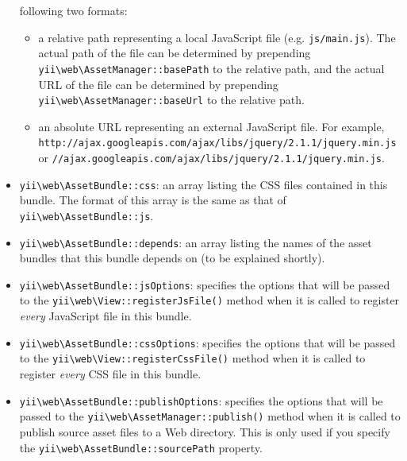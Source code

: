 \begin{itemize}
following two formats:\begin{itemize}
\item a relative path representing a local JavaScript file (e.g. \lstinline|js/main.js|). The actual path of the file
can be determined by prepending \texttt{yii{\allowbreak{}\textbackslash}web{\allowbreak{}\textbackslash}AssetManager\allowbreak{}::\allowbreak{}basePath} to the relative path, and the actual URL
of the file can be determined by prepending \texttt{yii{\allowbreak{}\textbackslash}web{\allowbreak{}\textbackslash}AssetManager\allowbreak{}::\allowbreak{}baseUrl} to the relative path.
\item an absolute URL representing an external JavaScript file. For example,
\lstinline|http://ajax.googleapis.com/ajax/libs/jquery/2.1.1/jquery.min.js| or
\lstinline|//ajax.googleapis.com/ajax/libs/jquery/2.1.1/jquery.min.js|.
\end{itemize}

\item \texttt{yii{\allowbreak{}\textbackslash}web{\allowbreak{}\textbackslash}AssetBundle\allowbreak{}::\allowbreak{}css}: an array listing the CSS files contained in this bundle. The format of this array
is the same as that of \texttt{yii{\allowbreak{}\textbackslash}web{\allowbreak{}\textbackslash}AssetBundle\allowbreak{}::\allowbreak{}js}.
\item \texttt{yii{\allowbreak{}\textbackslash}web{\allowbreak{}\textbackslash}AssetBundle\allowbreak{}::\allowbreak{}depends}: an array listing the names of the asset bundles that this bundle depends on
(to be explained shortly).
\item \texttt{yii{\allowbreak{}\textbackslash}web{\allowbreak{}\textbackslash}AssetBundle\allowbreak{}::\allowbreak{}jsOptions}: specifies the options that will be passed to the
\texttt{yii{\allowbreak{}\textbackslash}web{\allowbreak{}\textbackslash}View\allowbreak{}::\allowbreak{}registerJsFile()} method when it is called to register \textit{every} JavaScript file in this bundle.
\item \texttt{yii{\allowbreak{}\textbackslash}web{\allowbreak{}\textbackslash}AssetBundle\allowbreak{}::\allowbreak{}cssOptions}: specifies the options that will be passed to the
\texttt{yii{\allowbreak{}\textbackslash}web{\allowbreak{}\textbackslash}View\allowbreak{}::\allowbreak{}registerCssFile()} method when it is called to register \textit{every} CSS file in this bundle.
\item \texttt{yii{\allowbreak{}\textbackslash}web{\allowbreak{}\textbackslash}AssetBundle\allowbreak{}::\allowbreak{}publishOptions}: specifies the options that will be passed to the
\texttt{yii{\allowbreak{}\textbackslash}web{\allowbreak{}\textbackslash}AssetManager\allowbreak{}::\allowbreak{}publish()} method when it is called to publish source asset files to a Web directory.
This is only used if you specify the \texttt{yii{\allowbreak{}\textbackslash}web{\allowbreak{}\textbackslash}AssetBundle\allowbreak{}::\allowbreak{}sourcePath} property.
\end{itemize}
